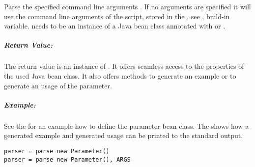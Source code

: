 \label{par:parse}

Parse the specified command line arguments . If no arguments
are specified it will use the command line arguments of the script, stored in
the , see , build-in variable.
 needs to be an instance of a Java bean class annotated
with  or .

\subparagraph{Return Value:}

The return value is an instance of . It offers
seamless access to the properties of the used Java bean class. It also
offers methods to generate an example or to generate an usage of the parameter.

\subparagraph{Example:}

See the  for an example how to define
the parameter bean class. The 
shows how a generated example and generated usage can be printed to the
standard output.

\begin{lstlisting}[style=Groovybash, label={lst:example_args_parse}]
parser = parse new Parameter()
parser = parse new Parameter(), ARGS
\end{lstlisting}

